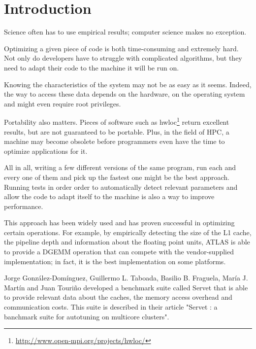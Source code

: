 \section{Introduction}
Science often has to use empirical results; computer science makes no
exception.

Optimizing a given piece of code is both time-consuming and extremely hard. Not
only do developers have to struggle with complicated algorithms, but they need
to adapt their code to the machine it will be run on.

Knowing the characteristics of the system may not be as easy as it seems.
Indeed, the way to access these data depends on the hardware, on the operating
system and might even require root privileges.

Portability also matters. Pieces of software such as
hwloc\footnote{\url{http://www.open-mpi.org/projects/hwloc/}} return excellent
results, but are not guaranteed to be portable. Plus, in the field of HPC, a
machine may become obsolete before programmers even have the time to optimize
applications for it\cite{ATLAS}\cite{Search_BLAS}.

All in all, writing a few different versions of the same program, run each and
every one of them and pick up the fastest one might be the best approach.
Running tests in order order to automatically detect relevant parameters and
allow the code to adapt itself to the machine is also a way to improve
performance.

This approach has been widely used and has proven successful in optimizing
certain operations. For example, by empirically detecting the size of the L1
cache, the pipeline depth and information about the floating point units, ATLAS
is able to provide a DGEMM operation that can compete with the vendor-supplied
implementation; in fact, it is the best implementation on some
platforms\cite{ATLAS}.

Jorge Gonz\'alez-Dom\'inguez, Guillermo L. Taboada, Basilio B. Fraguela, Mar\'ia
J. Mart\'in and Juan Touri\~{n}o developed a benchmark suite called Servet that
is able to provide relevant data about the caches, the memory access overhead
and communication costs. This suite is described in their article "Servet : a
banchmark suite for autotuning on multicore clusters".

